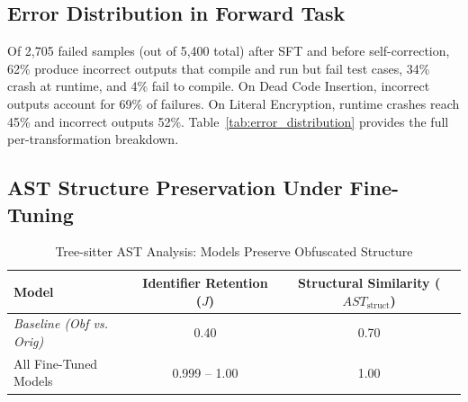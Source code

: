 \subsection{Error Distribution in Forward Task}
\label{appendix:error_analysis}

Of 2{,}705 failed samples (out of 5{,}400 total) after SFT and before
self-correction, 62\% produce incorrect outputs that compile and run but fail
test cases, 34\% crash at runtime, and 4\% fail to compile.
On Dead Code Insertion, incorrect outputs account for 69\% of failures.
On Literal Encryption, runtime crashes reach 45\% and incorrect outputs 52\%.
Table~\ref{tab:error_distribution} provides the full per-transformation
breakdown.

\begin{table}[htbp]
\centering
\caption{Distribution of error types for SFT forward failures before self-correction.}
\label{tab:error_distribution}
\end{table}

\subsection{AST Structure Preservation Under Fine-Tuning}

\begin{table}[htbp]
\centering
\caption{Tree-sitter AST Analysis: Models Preserve Obfuscated Structure}
\label{tab:tree-sitter}
\small
\begin{tabular}{lcc}
\toprule
\textbf{Model} & \textbf{Identifier Retention ($J$)} & \textbf{Structural Similarity ($AST_{\text{struct}}$)} \\
\midrule
\textit{Baseline (Obf vs. Orig)} & 0.40 & 0.70 \\
\midrule
All Fine-Tuned Models & 0.999 -- 1.00 & 1.00 \\
\bottomrule
\end{tabular}
\end{table}

